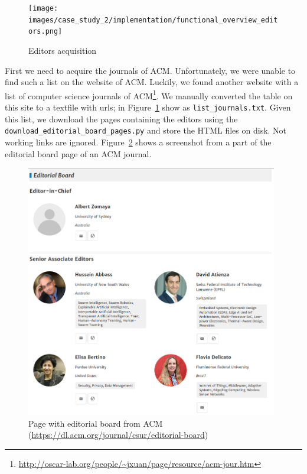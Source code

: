 \documentclass{ou-report}
\begin{document}
\begin{figure}[H]
    \centering
    \texttt{[image: images/case\_study\_2/implementation/functional\_overview\_editors.png]}
    \caption{Editors acquisition}
    \label{fig:functional_overview_editors}
\end{figure}

First we need to acquire the journals of ACM. Unfortunately, we were unable to
find such a list on the website of ACM. Luckily, we found another website with a
list of computer science journals of 
ACM\footnote{\url{http://oscar-lab.org/people/~jxuan/page/resource/acm-jour.htm}}.
We manually converted the table on this site to a textfile with urls; in
Figure~\ref{fig:functional_overview_editors} show as \verb|list_journals.txt|.
Given this list, we download the pages containing the editors using the
\verb|download_editorial_board_pages.py| and store the HTML files on disk. 
Not working links are ignored.
Figure~\ref{fig:acm_editorial_board} shows a screenshot from a part of the 
editorial board page of an ACM journal.

\begin{figure}[ht]
\centering
\includegraphics[width=11cm]{images/acm_editorial_board.png}
\caption{Page with editorial board from ACM (\url{https://dl.acm.org/journal/csur/editorial-board})}
\label{fig:acm_editorial_board}
\end{figure}
\end{document}
